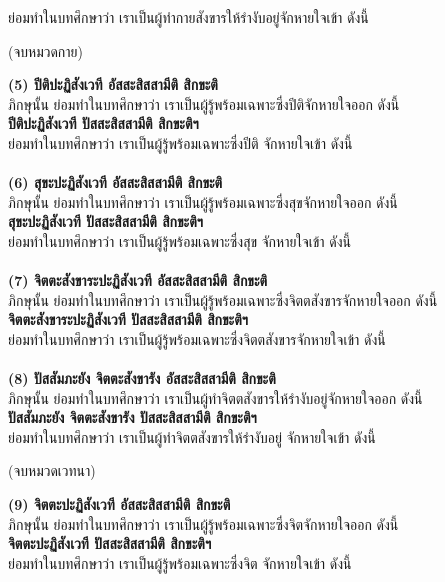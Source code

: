 \documentclass[12pt]{article}
\begin{document}
\indent ย่อมทำในบทศึกษาว่า เราเป็นผู้ทำกายสังขารให้รำงับอยู่จักหายใจเข้า ดังนี้
\begin{center}
(จบหมวดกาย)
\end{center}
\textbf{(5) ปีติปะฏิสังเวที อัสสะสิสสามีติ สิกขะติ}\\
\indent ภิกษุนั้น ย่อมทำในบทศึกษาว่า เราเป็นผู้รู้พร้อมเฉพาะซึ่งปีติจักหายใจออก ดังนี้\\
\textbf{ปีติปะฏิสังเวที ปัสสะสิสสามีติ สิกขะติฯ}\\
\indent ย่อมทำในบทศึกษาว่า เราเป็นผู้รู้พร้อมเฉพาะซึ่งปีติ จักหายใจเข้า ดังนี้\\
\\
\textbf{(6) สุขะปะฏิสังเวที อัสสะสิสสามีติ สิกขะติ}\\
\indent ภิกษุนั้น ย่อมทำในบทศึกษาว่า เราเป็นผู้รู้พร้อมเฉพาะซึ่งสุขจักหายใจออก ดังนี้\\
\textbf{สุขะปะฏิสังเวที ปัสสะสิสสามีติ สิกขะติฯ}\\
\indent ย่อมทำในบทศึกษาว่า เราเป็นผู้รู้พร้อมเฉพาะซึ่งสุข จักหายใจเข้า ดังนี้\\
\\
\textbf{(7) จิตตะสังขาระปะฏิสังเวที อัสสะสิสสามีติ สิกขะติ}\\
\indent ภิกษุนั้น ย่อมทำในบทศึกษาว่า เราเป็นผู้รู้พร้อมเฉพาะซึ่งจิตตสังขารจักหายใจออก ดังนี้\\
\textbf{จิตตะสังขาระปะฏิสังเวที ปัสสะสิสสามีติ สิกขะติฯ}\\
\indent ย่อมทำในบทศึกษาว่า เราเป็นผู้รู้พร้อมเฉพาะซึ่งจิตตสังขารจักหายใจเข้า ดังนี้\\
\\
\textbf{(8) ปัสสัมภะยัง จิตตะสังขารัง อัสสะสิสสามีติ สิกขะติ}\\
\indent ภิกษุนั้น ย่อมทำในบทศึกษาว่า เราเป็นผู้ทำจิตตสังขารให้รำงับอยู่จักหายใจออก ดังนี้\\
\textbf{ปัสสัมภะยัง จิตตะสังขารัง ปัสสะสิสสามีติ สิกขะติฯ}\\
\indent ย่อมทำในบทศึกษาว่า เราเป็นผู้ทำจิตตสังขารให้รำงับอยู่ จักหายใจเข้า ดังนี้
\begin{center}
(จบหมวดเวทนา)
\end{center}
\textbf{(9) จิตตะปะฏิสังเวที อัสสะสิสสามีติ สิกขะติ}\\
\indent ภิกษุนั้น ย่อมทำในบทศึกษาว่า เราเป็นผู้รู้พร้อมเฉพาะซึ่งจิตจักหายใจออก ดังนี้\\
\textbf{จิตตะปะฏิสังเวที ปัสสะสิสสามีติ สิกขะติฯ}\\
\indent ย่อมทำในบทศึกษาว่า เราเป็นผู้รู้พร้อมเฉพาะซึ่งจิต จักหายใจเข้า ดังนี้\\
\end{document}
